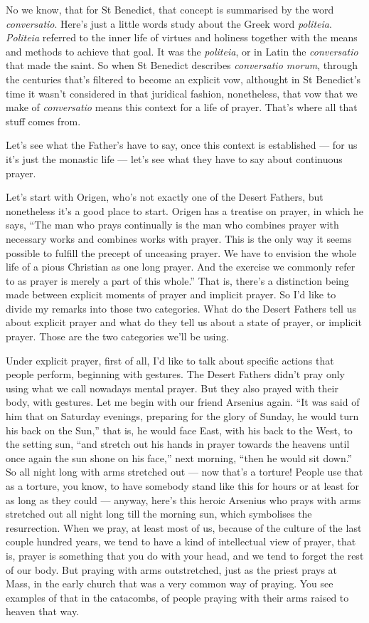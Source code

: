No we know, that for St Benedict, that concept is summarised by the word \emph{conversatio}. Here's just a little words study about the Greek word \emph{politeia}. \emph{Politeia} referred to the inner life of virtues and holiness together with the means and methods to achieve that goal. It was the \emph{politeia}, or in Latin the \emph{conversatio} that made the saint. So when St Benedict describes \emph{conversatio morum}, through the centuries that's filtered to become an explicit vow, althought in St Benedict's time it wasn't considered in that juridical fashion, nonetheless, that vow that we make of \emph{conversatio} means this context for a life of prayer. That's where all that stuff comes from.

Let's see what the Father's have to say, once this context is established --- for us it's just the monastic life --- let's see what they have to say about continuous prayer.

Let's start with Origen, who's not exactly one of the Desert Fathers, but nonetheless it's a good place to start. Origen has a treatise on prayer, in which he says, ``The man who prays continually is the man who combines prayer with necessary works and combines works with prayer. This is the only way it seems possible to fulfill the precept of unceasing prayer. We have to envision the whole life of a pious Christian as one long prayer. And the exercise we commonly refer to as prayer is merely a part of this whole.'' That is, there's a distinction being made between explicit moments of prayer and implicit prayer. So I'd like to divide my remarks into those two categories. What do the Desert Fathers tell us about explicit prayer and what do they tell us about a state of prayer, or implicit prayer. Those are the two categories we'll be using.

Under explicit prayer, first of all, I'd like to talk about specific actions that people perform, beginning with gestures. The Desert Fathers didn't pray only using what we call nowadays mental prayer. But they also prayed with their body, with gestures. Let me begin with our friend Arsenius again. ``It was said of him that on Saturday evenings, preparing for the glory of Sunday, he would turn his back on the Sun,'' that is, he would face East, with his back to the West, to the setting sun, ``and stretch out his hands in prayer towards the heavens until once again the sun shone on his face,'' next morning, ``then he would sit down.'' So all night long with arms stretched out --- now that's a torture! People use that as a torture, you know, to have somebody stand like this for hours or at least for as long as they could --- anyway, here's this heroic Arsenius who prays with arms stretched out all night long till the morning sun, which symbolises the resurrection. When we pray, at least most of us, because of the culture of the last couple hundred years, we tend to have a kind of intellectual view of prayer, that is, prayer is something that you do with your head, and we tend to forget the rest of our body. But praying with arms outstretched, just as the priest prays at Mass, in the early church that was a very common way of praying. You see examples of that in the catacombs, of people praying with their arms raised to heaven that way.

